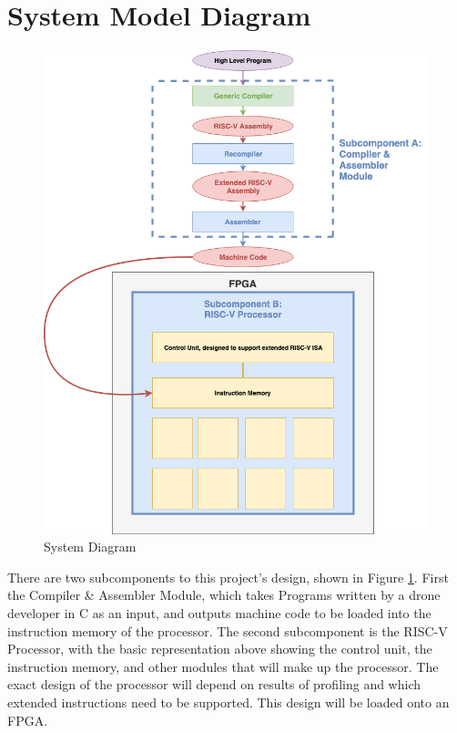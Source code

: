\documentclass[11pt, oneside]{article}      %
\begin{document}
\section{System Model Diagram}

\begin{figure}[!htbp]
\begin{centering}
\includegraphics[width=\linewidth]{img/systemDiagram.png} 
\caption{System Diagram}
\label{fig:systemDiagram}
\end{centering}
\end{figure}

There are two subcomponents to this project's design, shown in Figure \ref{fig:systemDiagram}. First the Compiler \& Assembler Module, which takes Programs written by a drone developer in C as an input, and outputs machine code to be loaded into the instruction memory of the processor. The second subcomponent is the RISC-V Processor, with the basic representation above showing the control unit, the instruction memory, and other modules that will make up the processor. The exact design of the processor will depend on results of profiling and which extended instructions need to be supported. This design will be loaded onto an FPGA.
\end{document}
